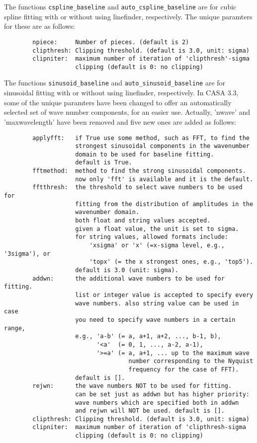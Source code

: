 The functions {\tt cspline\_baseline} and {\tt auto\_cspline\_baseline} 
are for cubic spline fitting with or without using linefinder, respectively. 
The unique paramters for these are as follows:

\small
\begin{verbatim}
        npiece:     Number of pieces. (default is 2)
        clipthresh: Clipping threshold. (default is 3.0, unit: sigma)
        clipniter:  maximum number of iteration of 'clipthresh'-sigma 
                    clipping (default is 0: no clipping)
\end{verbatim}
\normalsize

The functions {\tt sinusoid\_baseline} and {\tt auto\_sinusoid\_baseline} 
are for sinusoidal fitting with or without using linefinder, respectively. 
In CASA 3.3, some of the unique paramters have been changed to offer an 
automatically selected set of wave number components, for an easier use. 
Actually, 'nwave' and 'maxwavelength' have been removed and five new ones 
are added as follows: 

\small
\begin{verbatim}
        applyfft:   if True use some method, such as FFT, to find the 
                    strongest sinusoidal components in the wavenumber 
                    domain to be used for baseline fitting.
                    default is True.
        fftmethod:  method to find the strong sinusoidal components.
                    now only 'fft' is available and it is the default. 
        fftthresh:  the threshold to select wave numbers to be used for 
                    fitting from the distribution of amplitudes in the 
                    wavenumber domain.
                    both float and string values accepted. 
                    given a float value, the unit is set to sigma. 
                    for string values, allowed formats include:
                        'xsigma' or 'x' (=x-sigma level, e.g., '3sigma'), or 
                        'topx' (= the x strongest ones, e.g., 'top5').
                    default is 3.0 (unit: sigma).
        addwn:      the additional wave numbers to be used for fitting. 
                    list or integer value is accepted to specify every 
                    wave numbers. also string value can be used in case 
                    you need to specify wave numbers in a certain range,
                    e.g., 'a-b' (= a, a+1, a+2, ..., b-1, b),
                          '<a'  (= 0, 1, ..., a-2, a-1),
                          '>=a' (= a, a+1, ... up to the maximum wave 
                                   number corresponding to the Nyquist 
                                   frequency for the case of FFT).
                    default is [].
        rejwn:      the wave numbers NOT to be used for fitting.
                    can be set just as addwn but has higher priority: 
                    wave numbers which are specified both in addwn 
                    and rejwn will NOT be used. default is [].
        clipthresh: Clipping threshold. (default is 3.0, unit: sigma)
        clipniter:  maximum number of iteration of 'clipthresh-sigma 
                    clipping (default is 0: no clipping)
\end{verbatim}
\normalsize

